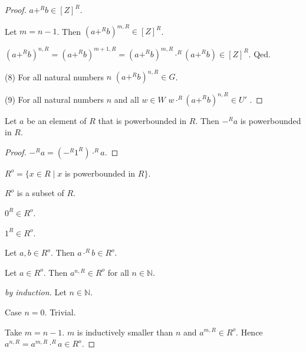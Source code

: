 \documentclass[11pt]{article}
\begin{document}
\begin{forthel}
\begin{proof}
$a +^{R} b \in [Z]^{R}$.

Let $m = n - 1$. Then $(a +^{R} b)^{m,R} \in [Z]^{R}$.

$(a +^{R} b)^{n,R} = (a +^{R} b)^{m+1,R}
= (a +^{R} b)^{m,R} \cdot^{R} (a +^{R} b) \in [Z]^{R}$.
Qed.

(8) For all natural numbers $n$ $(a +^{R} b)^{n,R} \in G$.

(9) For all natural numbers $n$ and all $w \in W$ 
$w \cdot^{R} (a +^{R} b)^{n,R} \in U'$ .

\end{proof}

\begin{lemma}[L 342]
Let $a$ be an element of $R$ that is powerbounded in $R$.
Then $-^{R} a$ is powerbounded in $R$.
\end{lemma}
\begin{proof}
$-^{R} a = (-^{R} 1^{R}) \cdot^{R} a$.
\end{proof}

\begin{definition}[L 310]  $R^o = \{x \in R \mid  x$ is powerbounded in $R\}$. 
\end{definition}

\begin{lemma} $R^o$ is a subset of $R$. \end{lemma}

\begin{lemma}[L 320]
$0^{R} \in R^o$.
\end{lemma}

\begin{lemma}[L 322] 
$1^{R} \in R^o$.
\end{lemma}

\begin{lemma}[L 324]
Let $a,b \in R^o$. Then $a \cdot^{R} b \in R^o$.
\end{lemma}

\begin{lemma}[L 324]
Let $a \in R^o$. Then $a^{n,R} \in R^o$ for all $n \in \mathbb{N}$.
\end{lemma}

\begin{proof}[by induction]
Let $n \in \mathbb{N}$.

Case $n = 0$. Trivial.

Take $m = n - 1$. $m$ is inductively smaller than $n$ and $a^{m,R} \in R^o$.
Hence $a^{n,R} = a^{m,R} \cdot^{R} a \in R^o$.
\end{proof}


\end{forthel}
\end{document}
